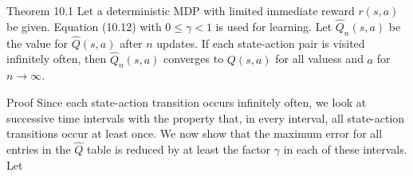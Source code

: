 \documentclass[10pt]{book}
\begin{document}
\begin{center}
\begin{enumerate}
\begin{center}
\begin{center}
\begin{center}
\begin{center}
\begin{displayquote}
Theorem 10.1 Let a deterministic MDP with limited immediate reward $r(s, a)$ be given. Equation (10.12) with $0 \leq \gamma<1$ is used for learning. Let $\hat{Q}_{n}(s, a)$ be the value for $\hat{Q}(s, a)$ after $n$ updates. If each state-action pair is visited infinitely often, then $\hat{Q}_{n}(s, a)$ converges to $Q(s, a)$ for all valuess and $a$ for $n \rightarrow \infty$.
\end{displayquote}

Proof Since each state-action transition occurs infinitely often, we look at successive time intervals with the property that, in every interval, all state-action transitions occur at least once. We now show that the maximum error for all entries in the $\hat{Q}$ table is reduced by at least the factor $\gamma$ in each of these intervals. Let


\end{center}
\end{center}
\end{center}
\end{center}
\end{enumerate}
\end{center}
\end{document}
